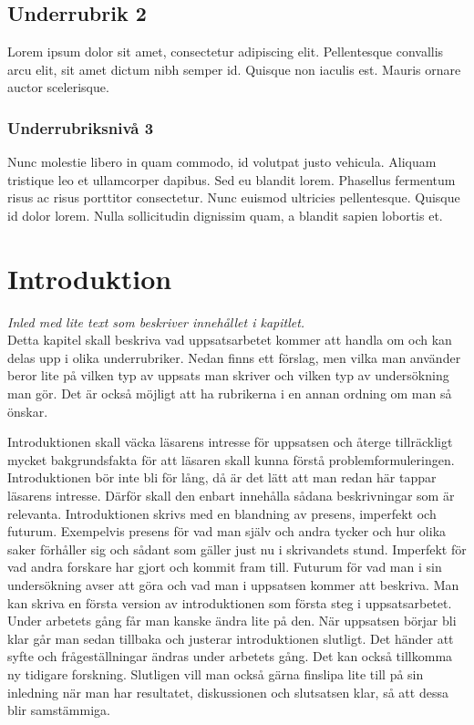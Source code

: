 \documentclass[a4paper,12pt]{article} %
\begin{document}
\subsection{Underrubrik 2}
Lorem ipsum dolor sit amet, consectetur adipiscing elit. Pellentesque convallis arcu elit, sit amet dictum nibh semper id. Quisque non iaculis est. Mauris ornare auctor scelerisque.

\subsubsection{Underrubriksnivå 3}
Nunc molestie libero in quam commodo, id volutpat justo vehicula. Aliquam tristique leo et ullamcorper dapibus. Sed eu blandit lorem. Phasellus fermentum risus ac risus porttitor consectetur. Nunc euismod ultricies pellentesque. Quisque id dolor lorem. Nulla sollicitudin dignissim quam, a blandit sapien lobortis et.

\section{Introduktion}
\emph{Inled med lite text som beskriver innehållet i kapitlet.}\\
Detta kapitel skall beskriva vad uppsatsarbetet kommer att handla om och kan delas upp i olika underrubriker. Nedan finns ett förslag, men vilka man använder beror lite på vilken typ av uppsats man skriver och vilken typ av undersökning man gör. Det är också möjligt att ha rubrikerna i en annan ordning om man så önskar.

Introduktionen skall väcka läsarens intresse för uppsatsen och återge tillräckligt mycket bakgrundsfakta för att läsaren skall kunna förstå problemformuleringen. Introduktionen bör inte bli för lång, då är det lätt att man redan här tappar läsarens intresse. Därför skall den enbart innehålla sådana beskrivningar som är relevanta.
Introduktionen skrivs med en blandning av presens, imperfekt och futurum. Exempelvis presens för vad man själv och andra tycker och hur olika saker förhåller sig och sådant som gäller just nu i skrivandets stund. Imperfekt för vad andra forskare har gjort och kommit fram till. Futurum för vad man i sin undersökning avser att göra och vad man i uppsatsen kommer att beskriva.
Man kan skriva en första version av introduktionen som första steg i uppsatsarbetet. Under arbetets gång får man kanske ändra lite på den. När uppsatsen börjar bli klar går man sedan tillbaka och justerar introduktionen slutligt. Det händer att syfte och frågeställningar ändras under arbetets gång. Det kan också tillkomma ny tidigare forskning. Slutligen vill man också gärna finslipa lite till på sin inledning när man har resultatet, diskussionen och slutsatsen klar, så att dessa blir samstämmiga.
\end{document}
